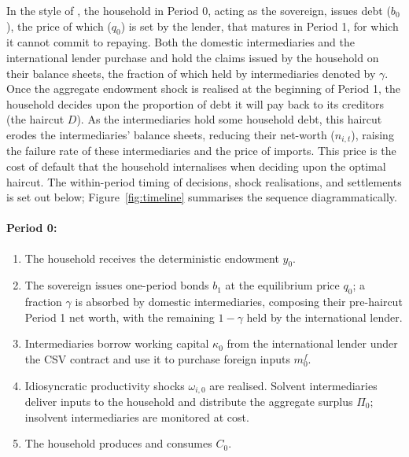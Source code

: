 \documentclass[11pt]{article}
\theoremstyle{definition}
\theoremstyle{plain}
\theoremstyle{remark}
\newcommand{\mf}{m^{f}}
\begin{document}
In the style of \citet{eaton_debt_1981}, the household in Period 0, acting as the sovereign, issues debt ($b_0$), the price of which ($q_0$) is set by the lender, that matures in Period 1, for which it cannot commit to repaying. Both the domestic intermediaries and the international lender purchase and hold the claims issued by the household on their balance sheets, the fraction of which held by intermediaries denoted by $\gamma$. Once the aggregate endowment shock is realised at the beginning of Period 1, the household decides upon the proportion of debt it will pay back to its creditors (the haircut $D$). As the intermediaries hold some household debt, this haircut erodes the intermediaries' balance sheets, reducing their net-worth ($n_{i,t}$), raising the failure rate of these intermediaries and the price of imports. This price is the cost of default that the household internalises when deciding upon the optimal haircut.
The within-period timing of decisions, shock realisations, and settlements is set out below; Figure~\ref{fig:timeline} summarises the sequence diagrammatically.

\paragraph{Period 0:}
\begin{enumerate}[label=(\alph*), itemsep=2pt, topsep=4pt]
    \item The household receives the deterministic endowment $y_0$.
    \item The sovereign issues one-period bonds $b_1$ at the equilibrium price $q_0$; a fraction $\gamma$ is absorbed by domestic intermediaries, composing their pre-haircut Period 1 net worth, with the remaining $1-\gamma$ held by the international lender.
    \item Intermediaries borrow working capital $\kappa_0$ from the international lender under the CSV contract and use it to purchase foreign inputs $\mf_0$.
    \item Idiosyncratic productivity shocks $\omega_{i,0}$ are realised. Solvent intermediaries deliver inputs to the household and distribute the aggregate surplus $\Pi_0$; insolvent intermediaries are monitored at cost.
    \item The household produces and consumes $C_0$.
\end{enumerate}
\end{document}
